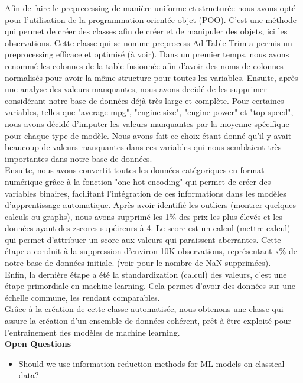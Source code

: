 \documentclass[12pt]{article}
\begin{document}
\noindent Afin de faire le preprecessing de manière uniforme et structurée nous avons opté pour l'utilisation de la programmation orientée objet (POO). C'est une méthode qui permet de créer des classes afin de créer et de manipuler des objets, ici les observations. Cette classe qui se nomme preprocess Ad Table Trim a permis un preprocessing efficace et optimisé (à voir). Dans un premier temps, nous avons renommé les colonnes de la table fusionnée afin d'avoir des noms de colonnes normalisés pour avoir la même structure pour toutes les variables. Ensuite, après une analyse des valeurs manquantes, nous avons decidé de les supprimer considérant notre base de données déjà très large et complète. Pour certaines variables, telles que "average mpg", "engine size", "engine power" et "top speed", nous avons décidé d'imputer les valeurs manquantes par la moyenne spécifique pour chaque type de modèle. Nous avons fait ce choix étant donné qu'il y avait beaucoup de valeurs manquantes dans ces variables qui nous semblaient très importantes dans notre base de données. \\

\noindent Ensuite, nous avons convertit toutes les données catégoriques en format numérique grâce à la fonction "one hot encoding" qui permet de créer des variables binaires, facilitant l'intégration de ces informations dans les modèles d'apprentissage automatique. Après avoir identifié les outliers (montrer quelques calculs ou graphs), nous avons supprimé les 1\% des prix les plus élevés et les données ayant des zscores supéireurs à 4. Le score est un calcul (mettre calcul) qui permet d'attribuer un score aux valeurs qui paraissent aberrantes. Cette étape a conduit à la suppression d'environ 10K observations, représentant x\% de notre base de données initiale. (voir pour le nombre de NaN supprimées).\\
Enfin, la dernière étape a été la standardization (calcul) des valeurs, c'est une étape primordiale en machine learning. Cela permet d'avoir des données sur une échelle commune, les rendant comparables. \\

\noindent Grâce à la création de cette classe automatisée, nous obtenons une classe qui assure la création d'un ensemble de données cohérent, prêt à être exploité pour l'entrainement des modèles de machine learning.\\



\noindent \textbf{Open Questions}
\begin{itemize}
    \item Should we use information reduction methods for ML models on classical data?
\end{itemize}
\end{document}
